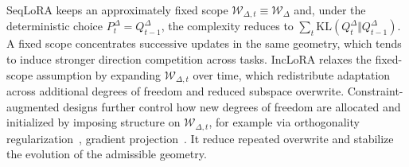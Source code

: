 \documentclass{article}
\theoremstyle{plain}
\theoremstyle{definition}
\theoremstyle{remark}
\begin{document}
SeqLoRA keeps an approximately fixed scope $\mathcal W_{\Delta,t}\equiv\mathcal W_\Delta$ and, under the deterministic choice $P_t^\Delta=Q_{t-1}^\Delta$, the complexity reduces to $\sum_t\mathrm{KL}(Q_t^\Delta\Vert Q_{t-1}^\Delta)$.
A fixed scope concentrates successive updates in the same geometry, which tends to induce stronger direction competition across tasks.
IncLoRA relaxes the fixed-scope assumption by expanding $\mathcal W_{\Delta,t}$ over time, which redistribute adaptation across additional degrees of freedom and reduced subspace overwrite.
Constraint-augmented designs further control how new degrees of freedom are allocated and initialized by imposing structure on $\mathcal W_{\Delta,t}$, for example via orthogonality regularization~\cite{wang2023orthogonal}, gradient projection~\citep{Liang_2024_CVPR,yang2024parametercollisionhinderingcontinual}.
It reduce repeated overwrite and stabilize the evolution of the admissible geometry.






 
\end{document}
